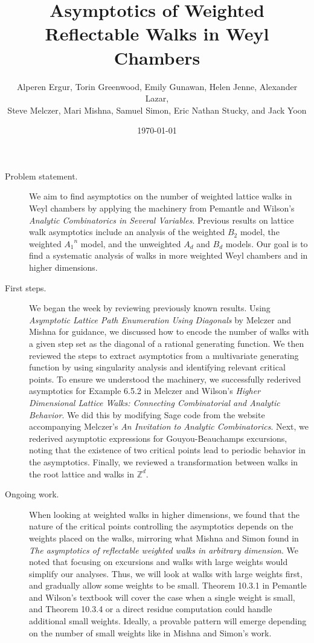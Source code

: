 \documentclass[letterpaper]{article}
\title{Asymptotics of Weighted Reflectable Walks in Weyl Chambers}
\author{Alperen Ergur, Torin Greenwood, Emily Gunawan, Helen Jenne, Alexander Lazar, \\Steve Melczer, Mari Mishna, Samuel Simon,  Eric Nathan Stucky, and Jack Yoon}
\date{\today}
\begin{document}
\fontsize{12}{13}
\maketitle
\large
\begin{description}
\item[Problem statement.]  We aim to find asymptotics on the number of weighted lattice walks in Weyl chambers by applying the machinery from Pemantle and Wilson's \emph{Analytic Combinatorics in Several Variables}.  Previous results on lattice walk asymptotics include an analysis of the weighted $B_2$ model, the weighted ${A_1}^n$ model, and the unweighted $A_d$ and $B_d$ models.  Our goal is to find a systematic analysis of walks in more weighted Weyl chambers and in higher dimensions.


\item[First steps.] We began the week by reviewing previously known results.  Using \emph{Asymptotic Lattice Path Enumeration Using Diagonals} by Melczer and Mishna for guidance, we discussed how to encode the number of walks with a given step set as the diagonal of a rational generating function.  We then reviewed the steps to extract asymptotics from a multivariate generating function by using singularity analysis and identifying relevant critical points.  To ensure we understood the machinery, we successfully rederived asymptotics for Example 6.5.2 in Melczer and Wilson's \emph{Higher Dimensional Lattice Walks: Connecting Combinatorial and Analytic Behavior}.  We did this by modifying Sage code from the website accompanying Melczer's \emph{An Invitation to Analytic Combinatorics}.  Next, we rederived asymptotic expressions for Gouyou-Beauchamps excursions, noting that the existence of two critical points lead to periodic behavior in the asymptotics.  Finally, we reviewed a transformation between walks in the root lattice and walks in $\mathbb{Z}^d$.

\item[Ongoing work.]  When looking at weighted walks in higher dimensions, we found that the nature of the critical points controlling the asymptotics depends on the weights placed on the walks, mirroring what Mishna and Simon found in \emph{The asymptotics of reflectable weighted walks in arbitrary dimension}.  We noted that focusing on excursions and walks with large weights would simplify our analyses.  Thus, we will look at walks with large weights first, and gradually allow some weights to be small.  Theorem 10.3.1 in Pemantle and Wilson's textbook will cover the case when a single weight is small, and Theorem 10.3.4 or a direct residue computation could handle additional small weights.  Ideally, a provable pattern will emerge depending on the number of small weights like in Mishna and Simon's work.


\end{description}
\end{document}
